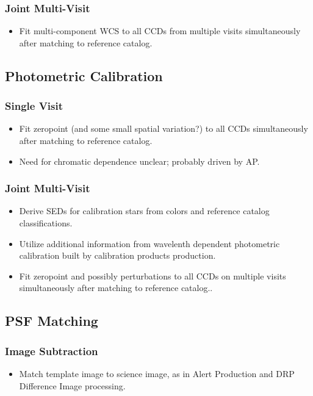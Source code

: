 \subsubsection{Joint Multi-Visit}
\begin{itemize}
\item Fit multi-component WCS to all CCDs from multiple visits simultaneously after matching to reference catalog.
\end{itemize}

\subsection{Photometric Calibration}
\subsubsection{Single Visit}
\begin{itemize}
\item Fit zeropoint (and some small spatial variation?) to all CCDs simultaneously after matching to reference catalog.
\item Need for chromatic dependence unclear; probably driven by AP.
\end{itemize}
\subsubsection{Joint Multi-Visit}
\begin{itemize}
\item Derive SEDs for calibration stars from colors and reference catalog classifications.
\item Utilize additional information from wavelenth dependent photometric calibration built by calibration products production.
\item Fit zeropoint and possibly perturbations to all CCDs on multiple visits simultaneously after matching to reference catalog..
\end{itemize}

\subsection{PSF Matching}
\subsubsection{Image Subtraction}
\begin{itemize}
\item Match template image to science image, as in Alert Production and DRP Difference Image processing.
\end{itemize}
